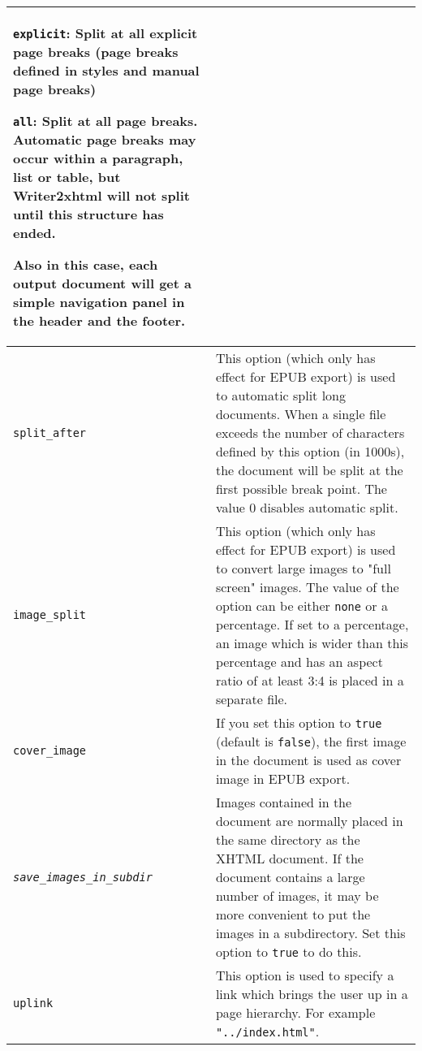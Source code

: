 \documentclass{article}
\newcommand\textstyleSourceText[1]{\texttt{\textmd{#1}}}
\begin{document}
\begin{center}
\begin{tabular}{|m{5.991cm}|m{10.621cm}|}
{\mdseries \textstyleSourceText{explicit}: Split at all explicit page breaks (page breaks defined in styles and manual page breaks)}

{\mdseries \textstyleSourceText{all}: Split at all page breaks. Automatic page breaks may occur within a paragraph, list or table, but Writer2xhtml will not split until this structure has ended.}

{\mdseries Also in this case, each output document will get a simple navigation panel in the header and the footer.}\\\hline
{\mdseries \textstyleSourceText{split\_after}} &
{\mdseries This option (which only has effect for EPUB export) is used to automatic split long documents. When a single file exceeds the number of characters defined by this option (in 1000s), the document will be split at the first possible break point. The value 0 disables automatic split.}\\\hline
{\mdseries \textstyleSourceText{image\_split}} &
{\mdseries This option (which only has effect for EPUB export) is used to convert large images to "full screen" images. The value of the option can be either \textstyleSourceText{none} or a percentage. If set to a percentage, an image which is wider than this percentage and has an aspect ratio of at least 3:4 is placed in a separate file.}\\\hline
{\mdseries \textstyleSourceText{cover\_image}} &
{\mdseries If you set this option to \textstyleSourceText{true} (default is \textstyleSourceText{false}), the first image in the document is used as cover image in EPUB export.}\\\hline
{\mdseries \textstyleSourceText{\emph{save\_images\_in\_subdir}}} &
{\mdseries Images contained in the document are normally placed in the same directory as the XHTML document. If the document contains a large number of images, it may be more convenient to put the images in a subdirectory. Set this option to \textstyleSourceText{true} to do this.}\\\hline
{\mdseries \textstyleSourceText{uplink}} &
{\mdseries This option is used to specify a link which brings the user up in a page hierarchy. For example \textstyleSourceText{"../index.html"}.}\\\hline
\end{tabular}
\end{center}
\end{document}
